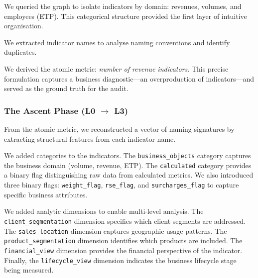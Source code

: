 \documentclass[12pt,a4paper]{article}
\begin{document}
\vspace{1em}

We queried the graph to isolate indicators by domain: revenues, volumes, and employees (ETP). This categorical structure provided the first layer of intuitive organisation.

\vspace{1em}

We extracted indicator names to analyse naming conventions and identify duplicates.

\vspace{1em}

We derived the atomic metric: \textit{number of revenue indicators}. This precise formulation captures a business diagnostic---an overproduction of indicators---and served as the ground truth for the audit.

\vspace{1em}


\subsubsection{The Ascent Phase (L0 $\to$ L3)}

\vspace{1em}

From the atomic metric, we reconstructed a vector of naming signatures by extracting structural features from each indicator name.

\vspace{1em}

We added categories to the indicators. The \texttt{business\_objects} category captures the business domain (volume, revenue, ETP). The \texttt{calculated} category provides a binary flag distinguishing raw data from calculated metrics. We also introduced three binary flags: \texttt{weight\_flag}, \texttt{rse\_flag}, and \texttt{surcharges\_flag} to capture specific business attributes.

\vspace{1em}

We added analytic dimensions to enable multi-level analysis. The \texttt{client\_segmentation} dimension specifies which client segments are addressed. The \texttt{sales\_location} dimension captures geographic usage patterns. The \texttt{product\_segmentation} dimension identifies which products are included. The \texttt{financial\_view} dimension provides the financial perspective of the indicator. Finally, the \texttt{lifecycle\_view} dimension indicates the business lifecycle stage being measured.
\end{document}
